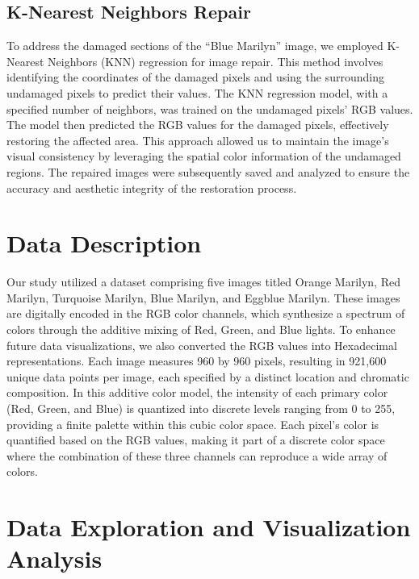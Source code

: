 \documentclass{article}
\begin{document}
\hypertarget{k-nearest-neighbors-repair}{%
\subsection{K-Nearest Neighbors
Repair}\label{k-nearest-neighbors-repair}}

To address the damaged sections of the ``Blue Marilyn'' image, we
employed K-Nearest Neighbors (KNN) regression for image repair. This
method involves identifying the coordinates of the damaged pixels and
using the surrounding undamaged pixels to predict their values. The KNN
regression model, with a specified number of neighbors, was trained on
the undamaged pixels' RGB values. The model then predicted the RGB
values for the damaged pixels, effectively restoring the affected area.
This approach allowed us to maintain the image's visual consistency by
leveraging the spatial color information of the undamaged regions. The
repaired images were subsequently saved and analyzed to ensure the
accuracy and aesthetic integrity of the restoration process.

\hypertarget{data-description}{%
\section{Data Description}\label{data-description}}

Our study utilized a dataset comprising five images titled Orange
Marilyn, Red Marilyn, Turquoise Marilyn, Blue Marilyn, and Eggblue
Marilyn. These images are digitally encoded in the RGB color channels,
which synthesize a spectrum of colors through the additive mixing of
Red, Green, and Blue lights. To enhance future data visualizations, we
also converted the RGB values into Hexadecimal representations. Each
image measures 960 by 960 pixels, resulting in 921,600 unique data
points per image, each specified by a distinct location and chromatic
composition. In this additive color model, the intensity of each primary
color (Red, Green, and Blue) is quantized into discrete levels ranging
from 0 to 255, providing a finite palette within this cubic color space.
Each pixel's color is quantified based on the RGB values, making it part
of a discrete color space where the combination of these three channels
can reproduce a wide array of colors.

\hypertarget{data-exploration-and-visualization-analysis}{%
\section{Data Exploration and Visualization
Analysis}\label{data-exploration-and-visualization-analysis}}
\end{document}
